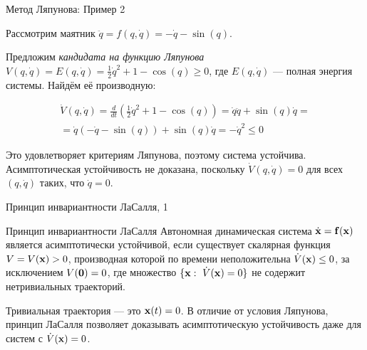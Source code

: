 \documentclass{beamer}
\begin{document}
\begin{frame}{Метод Ляпунова: Пример 2}
	\begin{flushleft}
		
		Рассмотрим маятник $\ddot{q} = f(q, \dot{q}) = -\dot{q} - \sin(q)$. 
		
		\bigskip
		
		Предложим \emph{кандидата на функцию Ляпунова} $V(q, \dot{q}) = E(q, \dot{q}) = \frac{1}{2} \dot{q}^2 + 1 - \cos(q)\geq 0$, где $E(q, \dot{q})$ — полная энергия системы. Найдём её производную:
		
		
		\begin{align}
			\dot V(q, \dot{q}) = 
			\frac{d}{dt} (\frac{1}{2} \dot{q}^2 + 1 - \cos(q)) =
			\dot{q} \ddot{q} + \sin(q)\dot{q} = \\
			=
			\dot{q} (-\dot{q} - \sin(q)) + \sin(q)\dot{q}
			=
			-\dot{q}^2 \leq 0
		\end{align}
		
		Это удовлетворяет критериям Ляпунова, поэтому система устойчива. Асимптотическая устойчивость не доказана, поскольку $\dot V(q, \dot{q}) = 0$ для всех $(q, \dot q)$ таких, что $\dot q = 0$.
		
	\end{flushleft}
\end{frame}

\begin{frame}{Принцип инвариантности ЛаСалля, 1}
	\begin{flushleft}
		
		\begin{block}{Принцип инвариантности ЛаСалля}
			Автономная динамическая система $\dot{\mathbf{x}} = \mathbf{f}(\mathbf{x})$ является асимптотически устойчивой, если существует скалярная функция $V = V(\mathbf{x}) > 0$, производная которой по времени неположительна $\dot V(\mathbf{x}) \leq 0$, за исключением $V(\mathbf{0}) = 0$, где множество $\{\mathbf{x}: \   \dot V(\mathbf{x}) = 0  \}$ не содержит нетривиальных траекторий.
		\end{block}
		
		\bigskip
		
		Тривиальная траектория — это $\mathbf{x}(t) = 0$. В отличие от условия Ляпунова, принцип ЛаСалля позволяет доказывать асимптотическую устойчивость даже для систем с $\dot V(\mathbf{x}) = 0$.
		
	\end{flushleft}
\end{frame}
\end{document}
